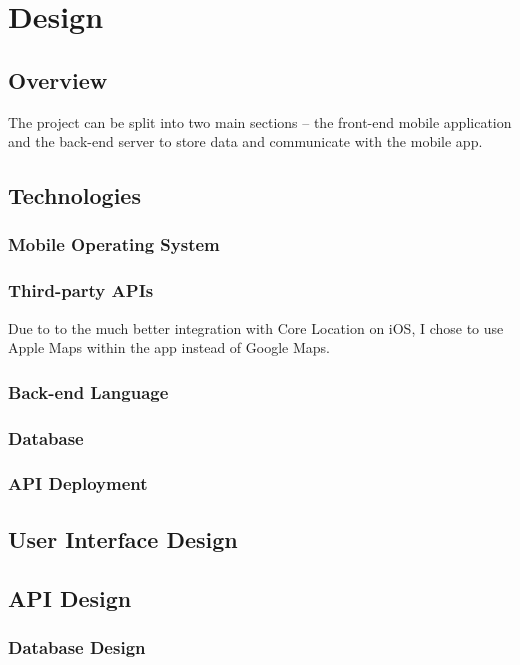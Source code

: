 \chapter{Design}

\section{Overview}

The project can be split into two main sections -- the front-end mobile application and the back-end server to store data and communicate with the mobile app. 

\section{Technologies}

\subsection{Mobile Operating System}


\subsection{Third-party APIs}

Due to to the much better integration with Core Location on iOS, I chose to use Apple Maps within the app instead of Google Maps.


\subsection{Back-end Language}

\subsection{Database}

\subsection{API Deployment}


\section{User Interface Design}


\section{API Design}


\subsection{Database Design}

